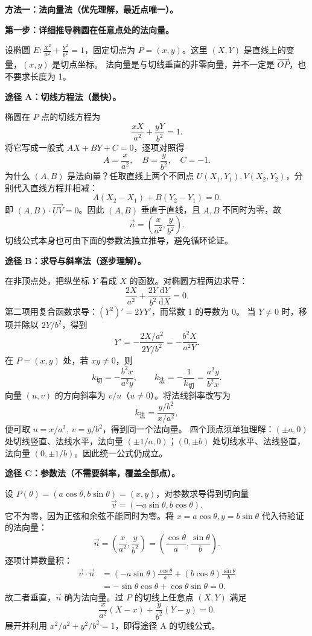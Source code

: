 \begin{proofbox}
\textbf{方法一：法向量法（优先理解，最近点唯一）。}

\textbf{第一步：详细推导椭圆在任意点处的法向量。}

设椭圆 $E:\frac{X^2}{a^2}+\frac{Y^2}{b^2}=1$，固定切点为 $P=(x,y)$。这里 $(X,Y)$ 是直线上的变量，$(x,y)$ 是切点坐标。
法向量是与切线垂直的非零向量，并不一定是 $\overrightarrow{OP}$，也不要求长度为 1。

\textbf{途径 A：切线方程法（最快）。}

椭圆在 $P$ 点的切线方程为
\[
\frac{xX}{a^2}+\frac{yY}{b^2}=1.
\]
将它写成一般式 $AX+BY+C=0$，逐项对照得
\[
 A=\frac{x}{a^2},\quad B=\frac{y}{b^2},\quad C=-1.
\]
为什么 $(A,B)$ 是法向量？任取直线上两个不同点 $U(X_1,Y_1),V(X_2,Y_2)$，分别代入直线方程并相减：
\[
 A(X_2-X_1)+B(Y_2-Y_1)=0.
\]
即 $(A,B)\cdot\overrightarrow{UV}=0$。因此 $(A,B)$ 垂直于直线，且 $A,B$ 不同时为零，故
\[
\boxed{\vec n=\left(\frac{x}{a^2},\frac{y}{b^2}\right).}
\]
切线公式本身也可由下面的参数法独立推导，避免循环论证。

\textbf{途径 B：求导与斜率法（逐步理解）。}

在非顶点处，把纵坐标 $Y$ 看成 $X$ 的函数。对椭圆方程两边求导：
\[
\frac{2X}{a^2}+\frac{2Y}{b^2}\frac{\mathrm dY}{\mathrm dX}=0.
\]
第二项用复合函数求导：$(Y^2)'=2YY'$，而常数 1 的导数为 0。
当 $Y\ne0$ 时，移项并除以 $2Y/b^2$，得到
\[
Y'=-\frac{2X/a^2}{2Y/b^2}=-\frac{b^2X}{a^2Y}.
\]
在 $P=(x,y)$ 处，若 $xy\ne0$，则
\[
 k_{\text{切}}=-\frac{b^2x}{a^2y},\qquad
 k_{\text{法}}=-\frac{1}{k_{\text{切}}}=\frac{a^2y}{b^2x}.
\]
向量 $(u,v)$ 的方向斜率为 $v/u$（$u\ne0$）。将法线斜率改写为
\[
 k_{\text{法}}=\frac{y/b^2}{x/a^2},
\]
便可取 $u=x/a^2,\ v=y/b^2$，得到同一个法向量。
四个顶点须单独理解：$(\pm a,0)$ 处切线竖直、法线水平，法向量 $(\pm1/a,0)$；$(0,\pm b)$ 处切线水平、法线竖直，法向量 $(0,\pm1/b)$。因此统一公式仍成立。

\textbf{途径 C：参数法（不需要斜率，覆盖全部点）。}

设 $P(\theta)=(a\cos\theta,b\sin\theta)=(x,y)$，对参数求导得到切向量
\[
\vec v=(-a\sin\theta,b\cos\theta).
\]
它不为零，因为正弦和余弦不能同时为零。将 $x=a\cos\theta,y=b\sin\theta$ 代入待验证的法向量：
\[
\vec n=\left(\frac{x}{a^2},\frac{y}{b^2}\right)
=\left(\frac{\cos\theta}{a},\frac{\sin\theta}{b}\right).
\]
逐项计算数量积：
\[
\begin{aligned}
\vec v\cdot\vec n
&=(-a\sin\theta)\frac{\cos\theta}{a}
 +(b\cos\theta)\frac{\sin\theta}{b}\\
&=-\sin\theta\cos\theta+\cos\theta\sin\theta=0.
\end{aligned}
\]
故二者垂直，$\vec n$ 确为法向量。过 $P$ 的切线上任意点 $(X,Y)$ 满足
\[
\frac{x}{a^2}(X-x)+\frac{y}{b^2}(Y-y)=0.
\]
展开并利用 $x^2/a^2+y^2/b^2=1$，即得途径 A 的切线公式。


\end{proofbox}
